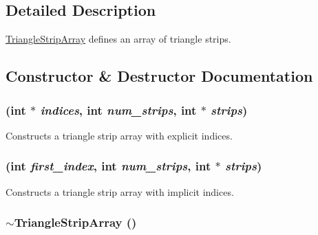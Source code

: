 \subsection{Detailed Description}
\hyperlink{classm3g_1_1TriangleStripArray}{TriangleStripArray} defines an array of triangle strips. 

\subsection{Constructor \& Destructor Documentation}
\hypertarget{classm3g_1_1TriangleStripArray_57d4e874819367084aeadb11593c4436}{
\subsubsection[{TriangleStripArray}]{ (int $\ast$ {\em indices}, \/  int {\em num\_\-strips}, \/  int $\ast$ {\em strips})}}
\label{classm3g_1_1TriangleStripArray_57d4e874819367084aeadb11593c4436}


Constructs a triangle strip array with explicit indices. \hypertarget{classm3g_1_1TriangleStripArray_d2ca9884a6ccf32da3cee977549b5ee0}{
\subsubsection[{TriangleStripArray}]{ (int {\em first\_\-index}, \/  int {\em num\_\-strips}, \/  int $\ast$ {\em strips})}}
\label{classm3g_1_1TriangleStripArray_d2ca9884a6ccf32da3cee977549b5ee0}


Constructs a triangle strip array with implicit indices. \hypertarget{classm3g_1_1TriangleStripArray_1cb3853bf79b7710d57044da818d2cde}{
\subsubsection[{$\sim$TriangleStripArray}]{\setlength{\rightskip}{0pt plus 5cm}$\sim${\bf TriangleStripArray} ()}}
\label{classm3g_1_1TriangleStripArray_1cb3853bf79b7710d57044da818d2cde}


